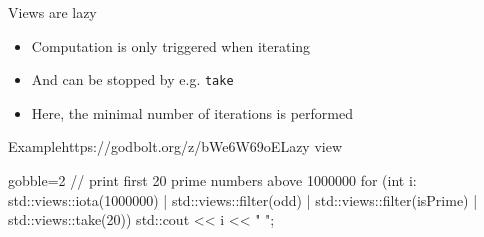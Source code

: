 \begin{frame}[fragile]
  \begin{block}{Views are lazy}
    \begin{itemize}
    \item Computation is only triggered when iterating
    \item And can be stopped by e.g. \texttt{take}
    \item Here, the minimal number of iterations is performed
    \end{itemize}
  \end{block}
  \begin{exampleblockGB}{Example}{https://godbolt.org/z/bWe6W69oE}{Lazy view}
    \begin{cppcode*}{gobble=2}
      // print first 20 prime numbers above 1000000
      for (int i: std::views::iota(1000000)
                  | std::views::filter(odd)
                  | std::views::filter(isPrime)
                  | std::views::take(20)) {
        std::cout << i << " ";
      }
    \end{cppcode*}
  \end{exampleblockGB}
\end{frame}
